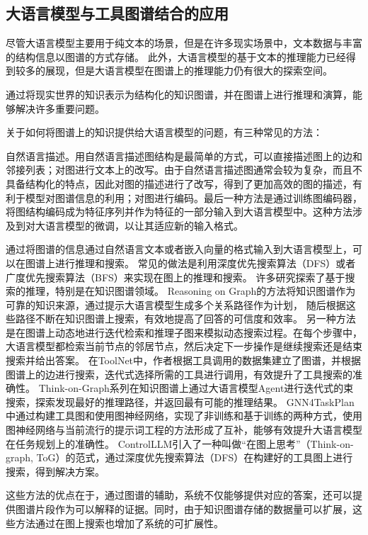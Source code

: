 \subsection{大语言模型与工具图谱结合的应用}

尽管大语言模型主要用于纯文本的场景，但是在许多现实场景中，文本数据与丰富的结构信息以图谱的方式存储。
此外，大语言模型的基于文本的推理能力已经得到较多的展现，但是大语言模型在图谱上的推理能力仍有很大的探索空间。

通过将现实世界的知识表示为结构化的知识图谱，并在图谱上进行推理和演算，能够解决许多重要问题。

关于如何将图谱上的知识提供给大语言模型的问题，有三种常见的方法：

自然语言描述。用自然语言描述图结构是最简单的方式，可以直接描述图上的边和邻接列表；对图进行文本上的改写。由于自然语言描述图通常会较为复杂，而且不具备结构化的特点，因此对图的描述进行了改写，得到了更加高效的图的描述，有利于模型对图谱信息的利用；对图进行编码。最后一种方法是通过训练图编码器，将图结构编码成为特征序列并作为特征的一部分输入到大语言模型中。这种方法涉及到对大语言模型的微调，以让其适应新的输入格式。

通过将图谱的信息通过自然语言文本或者嵌入向量的格式输入到大语言模型上，可以在图谱上进行推理和搜索。
常见的做法是利用深度优先搜索算法（DFS）或者广度优先搜索算法（BFS）来实现在图上的推理和搜索。
许多研究探索了基于搜索的推理，特别是在知识图谱领域。
Reasoning on Graph\cite{Luo2023}的方法将知识图谱作为可靠的知识来源，通过提示大语言模型生成多个关系路径作为计划，
随后根据这些路径不断在知识图谱上搜索，有效地提高了回答的可信度和效率。
另一种方法是在图谱上动态地进行迭代检索和推理子图来模拟动态搜索过程\cite{Liu2024, Sun2023, Ma2024}。在每个步骤中，大语言模型都检索当前节点的邻居节点，然后决定下一步操作是继续搜索还是结束搜索并给出答案。
在ToolNet\cite{Liu2024}中，作者根据工具调用的数据集建立了图谱，并根据图谱上的边进行搜索，迭代式选择所需的工具进行调用，有效提升了工具搜索的准确性。
Think-on-Graph系列\cite{Sun2023,Ma2024}在知识图谱上通过大语言模型Agent进行迭代式的束搜索，探索发现最好的推理路径，并返回最有可能的推理结果。
GNN4TaskPlan中\cite{wucan2024}通过构建工具图和使用图神经网络，实现了非训练和基于训练的两种方式，使用图神经网络与当前流行的提示词工程的方法形成了互补，能够有效提升大语言模型在任务规划上的准确性。
ControlLLM\cite{Liu2023a}引入了一种叫做“在图上思考”（Think-on-graph, ToG）的范式，通过深度优先搜索算法（DFS）在构建好的工具图上进行搜索，得到解决方案。

这些方法的优点在于，通过图谱的辅助，系统不仅能够提供对应的答案，还可以提供图谱片段作为可以解释的证据。同时，由于知识图谱存储的数据量可以扩展，这些方法通过在图上搜索也增加了系统的可扩展性。

